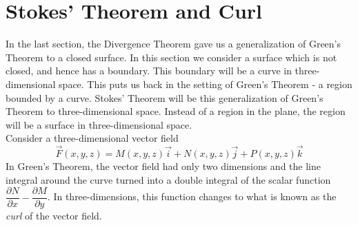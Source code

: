 \section{Stokes' Theorem and Curl}\label{sec:stokes_theorem}

In the last section, the Divergence Theorem gave us a generalization of Green's Theorem to a closed surface. In this section we consider a surface which is not closed, and hence has a boundary.  This boundary will be a curve in three-dimensional space. This puts us back in the setting of Green's Theorem - a region bounded by a curve. Stokes' Theorem will be this generalization of Green's Theorem to three-dimensional space. Instead of a region in the plane, the region will be a surface in three-dimensional space.\\

Consider a three-dimensional vector field $$\vec F(x,y,z) = M(x,y,z) \vec i + N(x,y,z) \vec j + P(x,y,z) \vec k$$ In Green's Theorem, the vector field had only two dimensions and the line integral around the curve turned into a double integral of the scalar function $\dfrac{\partial N}{\partial x} - \dfrac{\partial M}{\partial y}$.  In three-dimensions, this function changes to what is known as the \emph{curl} of the vector field. \\

\\

